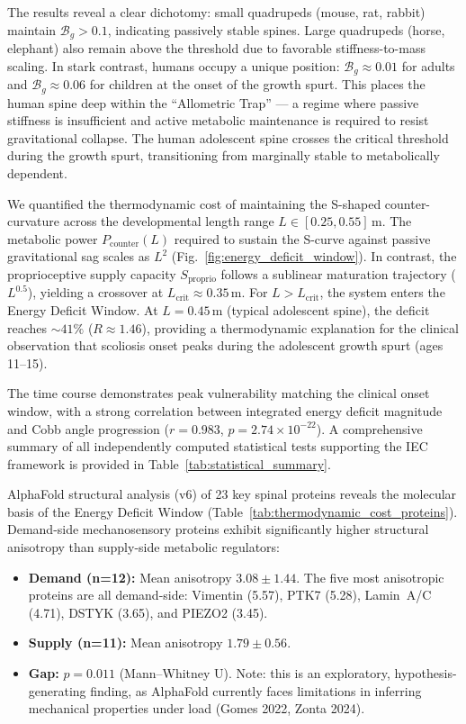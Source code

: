 \documentclass[11pt]{article}
\begin{document}
The results reveal a clear dichotomy: small quadrupeds (mouse, rat, rabbit) maintain $\mathcal{B}_g > 0.1$, indicating passively stable spines. Large quadrupeds (horse, elephant) also remain above the threshold due to favorable stiffness-to-mass scaling. In stark contrast, humans occupy a unique position: $\mathcal{B}_g \approx 0.01$ for adults and $\mathcal{B}_g \approx 0.06$ for children at the onset of the growth spurt. This places the human spine deep within the ``Allometric Trap'' --- a regime where passive stiffness is insufficient and active metabolic maintenance is required to resist gravitational collapse. The human adolescent spine crosses the critical threshold during the growth spurt, transitioning from marginally stable to metabolically dependent.

We quantified the thermodynamic cost of maintaining the S-shaped counter-curvature across the developmental length range $L \in [0.25, 0.55]$\,m. The metabolic power $P_{\mathrm{counter}}(L)$ required to sustain the S-curve against passive gravitational sag scales as $L^2$ (Fig.~\ref{fig:energy_deficit_window}). In contrast, the proprioceptive supply capacity $S_{\mathrm{proprio}}$ follows a sublinear maturation trajectory ($L^{0.5}$), yielding a crossover at $L_{\mathrm{crit}} \approx 0.35$\,m. For $L > L_{\mathrm{crit}}$, the system enters the Energy Deficit Window. At $L = 0.45$\,m (typical adolescent spine), the deficit reaches ${\sim}41\%$ ($R \approx 1.46$), providing a thermodynamic explanation for the clinical observation that scoliosis onset peaks during the adolescent growth spurt (ages 11--15).

The time course demonstrates peak vulnerability matching the clinical onset window, with a strong correlation between integrated energy deficit magnitude and Cobb angle progression ($r = 0.983$, $p = 2.74 \times 10^{-22}$). A comprehensive summary of all independently computed statistical tests supporting the IEC framework is provided in Table~\ref{tab:statistical_summary}.

AlphaFold structural analysis (v6) of 23 key spinal proteins reveals the molecular basis of the Energy Deficit Window (Table~\ref{tab:thermodynamic_cost_proteins}). Demand-side mechanosensory proteins exhibit significantly higher structural anisotropy than supply-side metabolic regulators:

\begin{itemize}
    \item \textbf{Demand (n=12):} Mean anisotropy $3.08 \pm 1.44$. The five most anisotropic proteins are all demand-side: Vimentin (5.57), PTK7 (5.28), Lamin~A/C (4.71), DSTYK (3.65), and PIEZO2 (3.45).
    \item \textbf{Supply (n=11):} Mean anisotropy $1.79 \pm 0.56$.
    \item \textbf{Gap:} $p = 0.011$ (Mann--Whitney U). Note: this is an exploratory, hypothesis-generating finding, as AlphaFold currently faces limitations in inferring mechanical properties under load (Gomes 2022, Zonta 2024).
\end{itemize}
\end{document}
